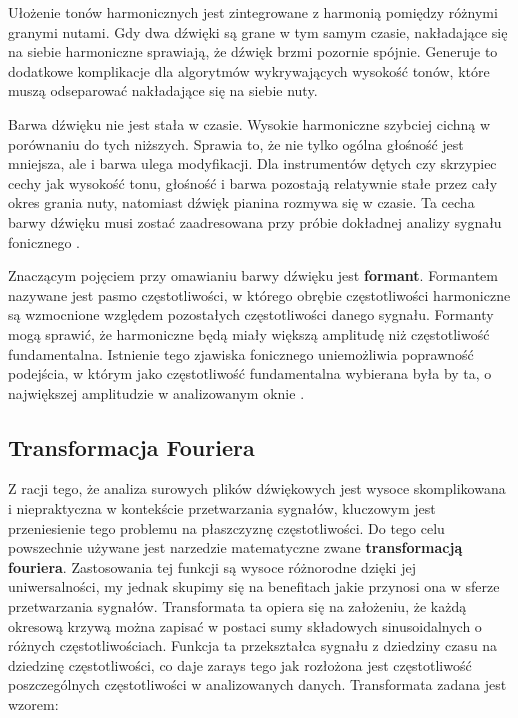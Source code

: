 \documentclass[12pt,a4paper,twoside]{mwart}
\begin{document}
Ułożenie tonów harmonicznych jest zintegrowane z harmonią pomiędzy różnymi granymi nutami. Gdy dwa dźwięki są grane w tym samym czasie, nakładające się na siebie harmoniczne sprawiają, że dźwięk brzmi pozornie spójnie. Generuje to dodatkowe komplikacje dla algorytmów wykrywających wysokość tonów, które muszą odseparować nakładające się na siebie nuty.

Barwa dźwięku nie jest stała w czasie. Wysokie harmoniczne szybciej cichną w porównaniu do tych niższych. Sprawia to, że nie tylko ogólna głośność jest mniejsza, ale i barwa ulega modyfikacji. Dla instrumentów dętych czy skrzypiec cechy jak wysokość tonu, głośność i barwa pozostają relatywnie stałe przez cały okres grania nuty, natomiast dźwięk pianina rozmywa się w czasie. Ta cecha barwy dźwięku musi zostać zaadresowana przy próbie dokładnej analizy sygnału fonicznego \cite[64-65]{Homerecording:DlaKazdego}.

Znaczącym pojęciem przy omawianiu barwy dźwięku jest \textbf{formant}. Formantem nazywane jest pasmo częstotliwości, w którego obrębie częstotliwości harmoniczne są wzmocnione względem pozostałych częstotliwości danego sygnału. Formanty mogą sprawić, że harmoniczne będą miały większą amplitudę niż częstotliwość fundamentalna. Istnienie tego zjawiska fonicznego uniemożliwia poprawność podejścia, w którym jako częstotliwość fundamentalna wybierana była by ta, o największej amplitudzie w analizowanym oknie \cite[62-63]{BarwaDzwieku:Formant}.

\subsection{Transformacja Fouriera}\label{sec:TF}
Z racji tego, że analiza surowych plików dźwiękowych jest wysoce skomplikowana i niepraktyczna w kontekście przetwarzania sygnałów, kluczowym jest przeniesienie tego problemu na płaszczyznę częstotliwości. Do tego celu powszechnie używane jest narzedzie matematyczne zwane \textbf{transformacją fouriera}. Zastosowania tej funkcji są wysoce różnorodne dzięki jej uniwersalności, my jednak skupimy się na benefitach jakie przynosi ona w sferze przetwarzania sygnałów. Transformata ta opiera się na założeniu, że każdą okresową krzywą można zapisać w postaci sumy składowych sinusoidalnych o różnych częstotliwościach. Funkcja ta przekształca sygnału z dziedziny czasu na dziedzinę częstotliwości, co daje zarays tego jak rozłożona jest częstotliwość poszczególnych częstotliwości w analizowanych danych. Transformata zadana jest wzorem:
\end{document}
